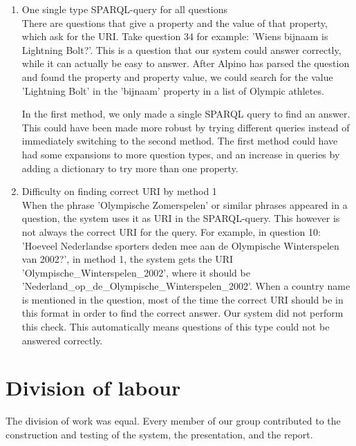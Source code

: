 \documentclass[a4paper,11pt]{article}
\begin{document}
\begin{enumerate}
\item One single type SPARQL-query for all questions \\
There are questions that give a property and the value of that property, which ask for the URI. Take question 34 for example: 'Wiens bijnaam is Lightning Bolt?'. This is a question that our system could answer correctly, while it can actually be easy to answer. After Alpino has parsed the question and found the property and property value, we could search for the value 'Lightning Bolt' in the 'bijnaam' property in a list of Olympic athletes.

In the first method, we only made a single SPARQL query to find an answer. This could have been made more robust by trying different queries instead of immediately switching to the second method. The first method could have had some expansions to more question types, and an increase in queries by adding a dictionary to try more than one property.


\item Difficulty on finding correct URI by method 1 \\
When the phrase 'Olympische Zomerspelen' or similar phrases appeared in a question, the system uses it as URI in the SPARQL-query. This however is not always the correct URI for the query. For example, in question 10: 'Hoeveel Nederlandse sporters deden mee aan de Olympische Winterspelen van 2002?', in method 1, the system gets the URI 'Olympische\_Winterspelen\_2002', where it should be 'Nederland\_op\_de\_Olympische\_Winterspelen\_2002'. When a country name is mentioned in the question, most of the time the correct URI should be in this format in order to find the correct answer. Our system did not perform this check. This automatically means questions of this type could not be answered correctly. 
\end{enumerate}


\section{Division of labour}
The division of work was equal. Every member of our group contributed to the construction and testing of the system, the presentation, and the report.

\nocite{*}


\end{document}
